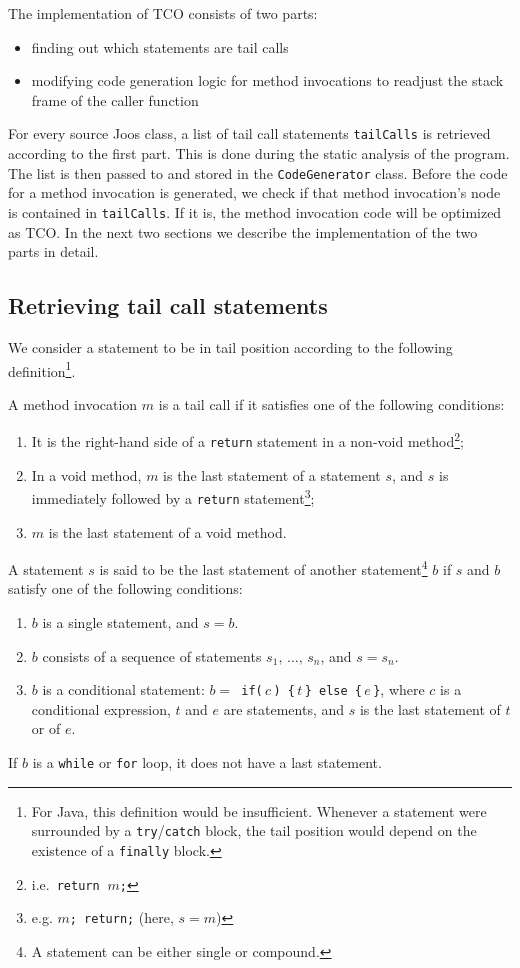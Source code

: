 \documentclass{tufte-handout}
\begin{document}
The implementation of TCO consists of two parts: 
\begin{itemize}
  \item finding out which statements are tail calls
  \item modifying code generation logic for method invocations to readjust the stack frame of the caller function
\end{itemize}
For every source Joos class, a list of tail call statements \verb'tailCalls' is retrieved according to the first part. This is done during the static analysis of the program. The list is then passed to and stored in the \verb'CodeGenerator' class. Before the code for a method invocation is generated, we check if that method invocation's node is contained in \verb'tailCalls'. If it is, the method invocation code will be optimized as TCO. In the next two sections we describe the implementation of the two parts in detail.

\subsection{Retrieving tail call statements}
We consider a statement to be in tail position according to the following definition\footnote{For Java, this definition would be insufficient. Whenever a statement were surrounded by a \texttt{try}/\texttt{catch} block, the tail position would depend on the existence of a \texttt{finally} block.}.
\begin{definition}
  A method invocation $m$ is a tail call if it satisfies one of the following conditions:
  \begin{enumerate}
    \item It is the right-hand side of a \verb'return' statement in a non-void method\footnote{i.e.~\texttt{return} $\ m$\texttt{;}};
    \item In a void method, $m$ is the last statement of a statement $s$, and $s$ is immediately followed by a \verb'return' statement\footnote{e.g. $m$\texttt{; return;} (here, $s=m$)};
    \item $m$ is the last statement of a void method.
  \end{enumerate}
\end{definition}

\begin{definition}
  A statement $s$ is said to be the last statement of another statement\footnote{A statement can be either single or compound.} $b$ if $s$ and $b$ satisfy one of the following conditions:
  \begin{enumerate}
    \item $b$ is a single statement, and $s=b$.
    \item $b$ consists of a sequence of statements $s_1,\,\dots,\,s_n$, and $s=s_n$.
    \item $b$ is a conditional statement: $b=$\verb' if('$\,c\,$\verb') {'$\,t\,$\verb'} else {'$\,e\,$\verb'}', where $c$ is a conditional expression, $t$ and $e$ are statements, and $s$ is the last statement of $t$ or of $e$.
  \end{enumerate}
  If $b$ is a \verb'while' or \verb'for' loop, it does not have a last statement.
\end{definition}
\end{document}
